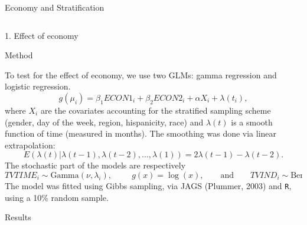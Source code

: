 \documentclass[final]{beamer}
\newcounter{acolumn}%
\def\autoheight{\vspace*{0pt}}%
\begin{document}
\begin{frame}
\begin{acolumns}[t]
\begin{column}{.48\linewidth}
\begin{block}{Economy and Stratification}
                \autoheight
               \end{block}
               
             
               \end{column}
              
            \end{acolumns}
        
        
        \vfill
    
    \begin{acolumns}[t]
    
    \begin{column}{.72\linewidth}
    \begin{center}
   		\LARGE{1. Effect of economy}
    \end{center}
     \begin{block}{Method}
       
       To test for the effect of economy, we use two GLMs: gamma regression and logistic regression.
       $$g(\mu_i)=\beta_1ECON1_i+\beta_2ECON2_i + \alpha X_i + \lambda(t_i),$$
       where $X_i$ are the covariates accounting for the stratified sampling scheme (gender, day of the week, region, hispanicity, race) and $\lambda(t)$ is a smooth function of time (measured in months). The smoothing was done via linear extrapolation:
       $$E\left(\lambda(t)|\lambda(t-1),\lambda(t-2),\ldots,\lambda(1)\right) = 2\lambda(t-1) - \lambda(t-2).$$
       The stochastic part of the models are respectively
       $$TVTIME_i\sim \mathrm{Gamma}(\nu, \lambda_i),\hspace{1cm} g(x)=\log(x),\qquad\mbox{and}\qquad TVIND_i\sim \mathrm{Bernouilli}(\pi_i), \hspace{1cm} g(x)=\mathrm{logit}(x).$$
       The model was fitted using Gibbs sampling, via JAGS (Plummer, 2003) and \texttt{R}, using a 10\% random sample.
        
     \end{block}
     
     
     \begin{block}{Results}
     

\end{block}
\end{column}
\end{acolumns}
\end{frame}
\end{document}
